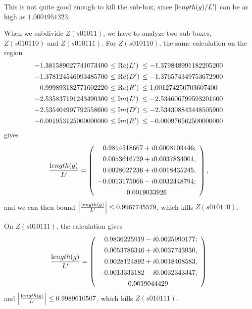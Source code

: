 This is not quite good enough to kill the sub-box, since
$|{\textrm length}(g)/L'|$ can be as high as $1.0001951323$.

When we subdivide $Z(s01011)$, we have to analyze two sub-boxes,
$Z(s010110)$ and $Z(s010111)$.
For $Z(s010110)$, the same calculation on the region
$$\begin{array}{rll}
-1.381589027741073400 &\hskip-6pt \leq {\mathrm Re}(L') &\hskip-6pt\leq -1.379848991182205200\\[4pt]
-1.378124546093485700 &\hskip-6pt\leq {\mathrm Re}(D')
&\hskip-6pt\leq -1.376574349753672900\\[4pt]
0.999893182771602220 &\hskip-6pt\leq {\mathrm Re}(R')&\hskip-6pt \leq 1.001274250703607400\\[4pt]
-2.535837191243490300&\hskip-6pt \leq {\mathrm Im}(L')&\hskip-6pt \leq
-2.534606799593201600\\[4pt]
-2.535404997792558600 &\hskip-6pt\leq {\mathrm Im}(D') &\hskip-6pt\leq -2.534308843448505900\\[4pt]
-0.001953125000000000&\hskip-6pt \leq {\mathrm Im}(R')
&\hskip-6pt\leq -0.000976562500000000
\end{array} 
$$
gives 
$$
{{\textrm length}(g) \over L'} = 
  \left(\begin{array}{c}
 \phantom{-}   0.9814518667 + i 0.0008103446;\\[4pt]
\phantom{-}      0.0053616729 + i 0.0037834001,\\[4pt]
  \phantom{-}    0.0028027236 + i 0.0018435245,\\[4pt]
    -0.0013175066 - i 0.0032448794;\\[4pt]
    0.0019033926
  \end{array}\right),
$$
and we can then bound $\left|{{\textrm length}(g) \over L'}\right| \leq 0.9967745579$,
which kills $Z(s010110)$.  

On $Z(s010111)$, the calculation gives
$$
{{\textrm length}(g) \over L'} =
  \left(\begin{array}{c}
\phantom{-}      0.9836225919 - i 0.0025990177;\\[4pt]
  \phantom{-}    0.0053786346 + i 0.0037743930,\\[4pt]
 \phantom{-}     0.0028124892 + i 0.0018408583,\\[4pt]
    -0.0013333182 - i 0.0032343347;\\[4pt]
    0.0019044429
  \end{array}\right)
$$
and $\left|{{\textrm length}(g) \over L'}\right| \leq 0.9989610507$,
which kills $Z(s010111)$.

 
